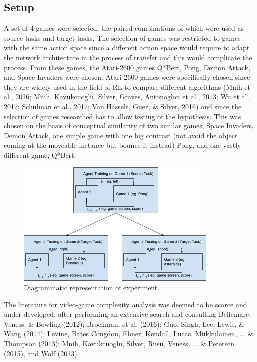 \subsection*{Setup}
A set of 4 games were selected, the paired combinations of which were used as source tasks and target tasks. The selection of games was restricted to games with the same action space since a different action space would require to adapt the network architecture in the process of transfer and this would complicate the process. From these games, the Atari-2600 games Q*Bert, Pong, Demon Attack, and Space Invaders were chosen. Atari-2600 games were specifically chosen since they are widely used in the field of RL to compare different algorithms (Mnih et al., 2016; Mnih, Kavukcuoglu, Silver, Graves, Antonoglou et al., 2013; Wu et al., 2017; Schulman et al., 2017; Van Hasselt, Guez, \& Silver, 2016) and since the selection of games researched has to allow testing of the hypothesis. This was chosen on the basis of conceptual similarity of two similar games, Space Invaders, Demon Attack, one simple game with one big contrast (not avoid the object coming at the moveable instance but bounce it instead) Pong, and one vastly different game, Q*Bert. 
\begin{figure}[t]
	\includegraphics[width=\columnwidth]{fig4.png} 
	\caption{Diagrammatic representation of experiment.}
\end{figure}
The literature for video-game complexity analysis was deemed to be scarce and under-developed, after performing an extensive search and consulting Bellemare, Veness, \& Bowling (2012); Brockman, et al. (2016); Guo, Singh, Lee, Lewis, \& Wang (2014); Levine, Bates Congdon, Ebner, Kendall, Lucas, Miikkulainen, ... \& Thompson (2013); Mnih, Kavukcuoglu, Silver, Rusu, Veness, ... \& Petersen (2015), and Wolf (2013). 

